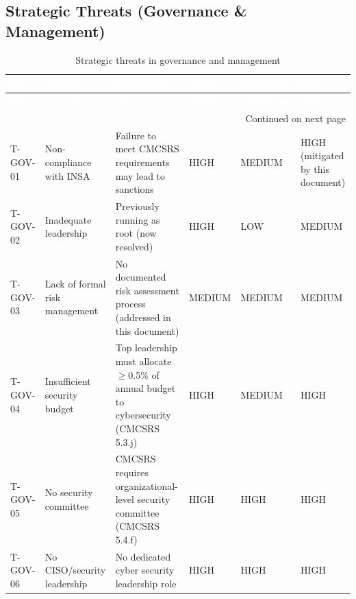 \subsection{Strategic Threats (Governance \& Management)}
\begin{center}
\begin{longtable}{|p{}|p{}|p{}|p{}|p{}|p{}|}
\caption[Strategic Threats]{Strategic threats in governance and management}
\label{tab:strategic-threats} \\
\hline
\rowcolor{mooveblue}
\textcolor{white}{\textbf{ID}} & \textcolor{white}{\textbf{Threat}} & \textcolor{white}{\textbf{Description}} & \textcolor{white}{\textbf{Impact}} & \textcolor{white}{\textbf{Likelihood}} & \textcolor{white}{\textbf{Risk}} \\
\hline
\endfirsthead
\hline
\rowcolor{mooveblue}
\textcolor{white}{\textbf{ID}} & \textcolor{white}{\textbf{Threat}} & \textcolor{white}{\textbf{Description}} & \textcolor{white}{\textbf{Impact}} & \textcolor{white}{\textbf{Likelihood}} & \textcolor{white}{\textbf{Risk}} \\
\hline
\endhead
\hline
\multicolumn{6}{|r|}{Continued on next page} \\
\hline
\endfoot
\hline
\endlastfoot
T-GOV-01 & Non-compliance with INSA & Failure to meet CMCSRS requirements may lead to sanctions & HIGH & MEDIUM & HIGH (mitigated by this document) \\
T-GOV-02 & Inadequate leadership & Previously running as root (now resolved) & HIGH & LOW & MEDIUM \\
T-GOV-03 & Lack of formal risk management & No documented risk assessment process (addressed in this document) & MEDIUM & MEDIUM & MEDIUM \\
T-GOV-04 & Insufficient security budget & Top leadership must allocate $\ge$0.5\% of annual budget to cybersecurity (CMCSRS 5.3.j) & HIGH & MEDIUM & HIGH \\
T-GOV-05 & No security committee & CMCSRS requires organizational-level security committee (CMCSRS 5.4.f) & HIGH & HIGH & HIGH \\
T-GOV-06 & No CISO/security leadership & No dedicated cyber security leadership role & HIGH & HIGH & HIGH \\
\hline
\end{longtable}
\end{center}

